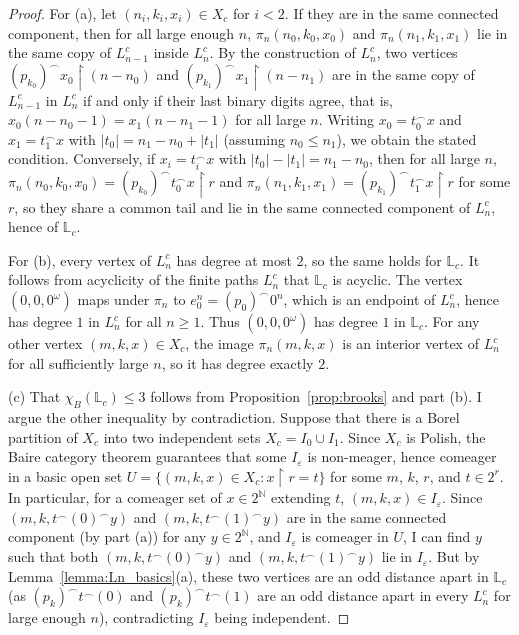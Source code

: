 \documentclass[11pt]{article}
\theoremstyle{plain}
\theoremstyle{definition}
\theoremstyle{remark}
\begin{document}
\begin{proof}
    For (a), let $(n_i,k_i,x_i)\in X_c$ for $i<2$.
    If they are in the same connected component, then for all large enough $n$, $\pi_n(n_0,k_0,x_0)$ and $\pi_n(n_1,k_1,x_1)$ lie in the same copy of $L^c_{n-1}$ inside $L^c_n$.
    By the construction of $L^c_n$, two vertices $(p_{k_0})^\smallfrown x_0\restriction(n-n_0)$ and $(p_{k_1})^\smallfrown x_1\restriction(n-n_1)$ are in the same copy of $L^c_{n-1}$ in $L^c_n$ if and only if their last binary digits agree, that is, $x_0(n-n_0-1)=x_1(n-n_1-1)$ for all large $n$.
    Writing $x_0=t_0^\smallfrown x$ and $x_1=t_1^\smallfrown x$ with $|t_0|=n_1-n_0+|t_1|$ (assuming $n_0\leq n_1$), we obtain the stated condition.
    Conversely, if $x_i=t_i^\smallfrown x$ with $|t_0|-|t_1|=n_1-n_0$, then for all large $n$, $\pi_n(n_0,k_0,x_0)=(p_{k_0})^\smallfrown t_0^\smallfrown x\restriction r$ and $\pi_n(n_1,k_1,x_1)=(p_{k_1})^\smallfrown t_1^\smallfrown x\restriction r$ for some $r$, so they share a common tail and lie in the same connected component of $L^c_n$, hence of $\mathbb L_c$.

    For (b), every vertex of $L^c_n$ has degree at most $2$, so the same holds for $\mathbb L_c$.
    It follows from acyclicity of the finite paths $L^c_n$ that $\mathbb L_c$ is acyclic.
    The vertex $(0,0,0^\omega)$ maps under $\pi_n$ to $e_0^n=(p_0)^\smallfrown 0^n$, which is an endpoint of $L^c_n$, hence has degree $1$ in $L^c_n$ for all $n\geq1$.
    Thus $(0,0,0^\omega)$ has degree $1$ in $\mathbb L_c$.
    For any other vertex $(m,k,x)\in X_c$, the image $\pi_n(m,k,x)$ is an interior vertex of $L^c_n$ for all sufficiently large $n$, so it has degree exactly $2$.

    (c) That $\chi_B(\mathbb L_c)\leq3$ follows from Proposition~\ref{prop:brooks} and part (b).
    I argue the other inequality by contradiction.
    Suppose that there is a Borel partition of $X_c$ into two independent sets $X_c=I_0\cup I_1$.
    Since $X_c$ is Polish, the Baire category theorem guarantees that some $I_\varepsilon$ is non-meager, hence comeager in a basic open set $U=\{(m,k,x)\in X_c:x\restriction r=t\}$ for some $m$, $k$, $r$, and $t\in2^r$.
    In particular, for a comeager set of $x\in2^\mathbb N$ extending $t$, $(m,k,x)\in I_\varepsilon$.
    Since $(m,k,t^\smallfrown(0)^\smallfrown y)$ and $(m,k,t^\smallfrown(1)^\smallfrown y)$ are in the same connected component (by part (a)) for any $y\in2^\mathbb N$, and $I_\varepsilon$ is comeager in $U$, I can find $y$ such that both $(m,k,t^\smallfrown(0)^\smallfrown y)$ and $(m,k,t^\smallfrown(1)^\smallfrown y)$ lie in $I_\varepsilon$.
    But by Lemma~\ref{lemma:Ln_basics}(a), these two vertices are an odd distance apart in $\mathbb L_c$ (as $(p_k)^\smallfrown t^\smallfrown(0)$ and $(p_k)^\smallfrown t^\smallfrown(1)$ are an odd distance apart in every $L^c_n$ for large enough $n$), contradicting $I_\varepsilon$ being independent.
\end{proof}
\end{document}
